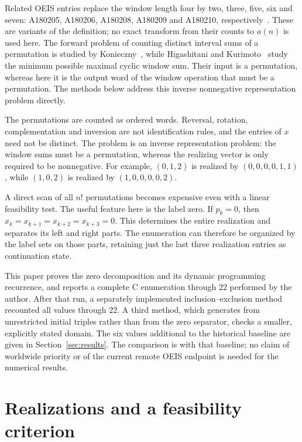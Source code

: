 \documentclass[11pt]{article}
\theoremstyle{definition}
\theoremstyle{remark}
\begin{document}
Related OEIS entries replace the window length four by two, three, five,
six and seven: A180205, A180206, A180208, A180209 and A180210,
respectively~\cite{family}. These are variants of the definition; no exact
transform from their counts to $a(n)$ is used here. The forward problem of
counting distinct interval sums of a permutation is studied by
Konieczny~\cite{konieczny}, while Higashitani and Kurimoto~\cite{higashitani}
study the minimum possible maximal cyclic window sum. Their input is a
permutation, whereas here it is the output word of the window operation
that must be a permutation. The methods below address this inverse
nonnegative representation problem directly.

The permutations are counted as ordered words. Reversal, rotation,
complementation and inversion are not identification rules, and the entries
of $x$ need not be distinct. The problem is an inverse representation
problem: the window sums must be a permutation, whereas the realizing vector
is only required to be nonnegative. For example, $(0,1,2)$ is realized by
$(0,0,0,0,1,1)$, while $(1,0,2)$ is realized by $(1,0,0,0,0,2)$.

A direct scan of all $n!$ permutations becomes expensive even with a linear
feasibility test. The useful feature here is the label zero. If $p_k=0$,
then $x_k=x_{k+1}=x_{k+2}=x_{k+3}=0$. This determines the entire realization
and separates its left and right parts. The enumeration can therefore be
organized by the label sets on those parts, retaining just the last three
realization entries as continuation state.

This paper proves the zero decomposition and its dynamic programming
recurrence, and reports a complete C enumeration through $22$ performed by
the author. After that run, a separately implemented inclusion--exclusion
method recounted all values through $22$. A third method, which generates
from unrestricted initial triples rather than from the zero separator,
checks a smaller, explicitly stated domain. The six values additional to
the historical baseline are given in Section~\ref{sec:results}.
The comparison is with that baseline; no claim of worldwide priority or of
the current remote OEIS endpoint is needed for the numerical results.

\section{Realizations and a feasibility criterion}
\label{sec:realization}
\end{document}
